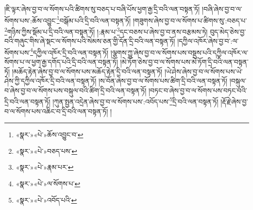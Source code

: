 །ཇི་ལྟར་ཞེས་བྱ་བ་ལ་སོགས་པའི་ཚིགས་སུ་བཅད་པ་བཞི་པོས་ཕྱག་རྒྱ་དྲི་བའི་ལན་བསྟན་ཏོ། །བཞི་ཞེས་བྱ་བ་ལ་སོགས་པས་:ཆོས་འབྱུང་\footnote{«སྣར་»«པེ་»ཆོས་འབྱུང་བ་}བསྒོམ་པའི་དྲི་བའི་ལན་བསྟན་ཏོ། །གཟུགས་ཞེས་བྱ་བ་ལ་སོགས་པ་ཚིགས་སུ་:བཅད་པ་\footnote{«སྣར་»«པེ་»བཅད་པས་}གཉིས་ཀྱིས་སྡོམ་པ་དྲི་བའི་ལན་བསྟན་ཏོ། །:རྣམ་པ་\footnote{«སྣར་»«པེ་»རྣམ་པར་}དང་བཅས་པ་ཞེས་བྱ་བ་ནས་བརྩམས་ཏེ། བུད་མེད་ཅེས་བྱ་བའི་གཞུང་གིས་ཞེ་སྡང་ལ་སོགས་པའི་སེམས་ཅན་གྱི་དོན་དྲི་བའི་ལན་བསྟན་ཏོ། །དཀྱིལ་འཁོར་ཞེས་བྱ་བ་:ལ་སོགས་པས་\footnote{«སྣར་»«པེ་»ལ་སོགས་པ་}དཀྱིལ་འཁོར་དྲི་བའི་ལན་བསྟན་ཏོ། །ལྕགས་ཀྱུ་ཞེས་བྱ་བ་ལ་སོགས་པས་བསྡུས་པའི་དཀྱིལ་འཁོར་ལ་སོགས་པ་ལ་ཕྱག་རྒྱ་དགོད་པའི་དྲི་བའི་ལན་བསྟན་ཏོ། །མེ་ཏོག་ཅེས་བྱ་བ་ལ་སོགས་པས་མེ་ཏོག་དྲི་བའི་ལན་བསྟན་ཏོ། །མཆོད་རྟེན་ཞེས་བྱ་བ་ལ་སོགས་པས་མཆོད་རྟེན་དྲི་བའི་ལན་བསྟན་ཏོ། །ཡེ་ཤེས་ཞེས་བྱ་བ་ལ་སོགས་པས་ཡེ་ཤེས་ཀྱི་དཀྱིལ་འཁོར་དྲི་བའི་ལན་བསྟན་ཏོ། །ས་བོན་ཞེས་བྱ་བ་ལ་སོགས་པས་ཚིག་དྲི་བའི་ལན་བསྟན་ཏོ། །བསྐུལ་བ་ཞེས་བྱ་བ་ལ་སོགས་པས་བསྐུལ་བའི་ཚིག་དྲི་བའི་ལན་བསྟན་ཏོ། །བཏང་བ་ཞེས་བྱ་བ་ལ་སོགས་པས་བཏང་བའི་དྲི་བའི་ལན་བསྟན་ཏོ། །ཀུན་སྤྱན་འདྲེན་ཞེས་བྱ་བ་ལ་སོགས་པས་:འབོད་པས་\footnote{«སྣར་»«པེ་»འབོད་པའི་}དྲི་བའི་ལན་བསྟན་ཏོ། །རྡོ་རྗེ་ཞེས་བྱ་བ་ལ་སོགས་པས་འཆིང་བ་དྲི་བའི་ལན་བསྟན་ཏོ། །
